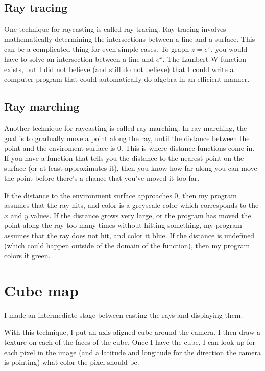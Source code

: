 \subsection*{Ray tracing}

One technique for raycasting is called ray tracing.  Ray tracing involves mathematically determining the intersections between a line and a surface.  This can be a complicated thing for even simple cases.  To graph $z=e^x$, you would have to solve an intersection between a line and $e^x$.  The Lambert W function exists, but I did not believe (and still do not believe) that I could write a computer program that could automatically do algebra in an efficient manner.

\subsection*{Ray marching}

Another technique for raycasting is called ray marching.  In ray marching, the goal is to gradually move a point along the ray, until the distance between the point and the enviroment surface is 0.  This is where distance functions come in.  If you have a function that tells you the distance to the nearest point on the surface (or at least approximates it), then you know how far along you can move the point before there's a chance that you've moved it too far.

If the distance to the environment surface approaches 0, then my program assumes that the ray hits, and color is a greyscale color which corresponds to the $x$ and $y$ values.  If the distance grows very large, or the program has moved the point along the ray too many times without hitting something, my program assumes that the ray does not hit, and color it blue.  If the distance is undefined (which could happen outside of the domain of the function), then my program colors it green.

\section*{Cube map}

I made an intermediate stage between casting the rays and displaying them.

With this technique, I put an axis-aligned cube around the camera.  I then draw a texture on each of the faces of the cube.  Once I have the cube, I can look up for each pixel in the image (and a latitude and longitude for the direction the camera is pointing) what color the pixel should be.

